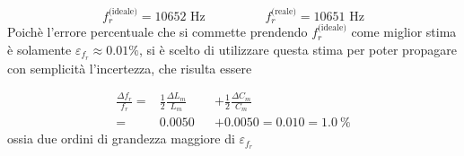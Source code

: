 \documentclass[12pt,italian]{article}
\begin{document}
\begin{equation*}
	f_{r}^{\text{(ideale)}} = 10652 \text{ Hz} \hspace{2cm} f_{r}^{\text{(reale)}} = 10651 \text{ Hz}
\end{equation*}
Poichè l'errore percentuale che si commette prendendo $f_{r}^{\text{(ideale)}}$
come miglior stima è solamente $\varepsilon_{f_r} \approx 0.01\%$, si è scelto
di utilizzare questa stima per poter propagare con semplicità l'incertezza, che
risulta essere

\begin{equation*}
	\begin{alignedat}{2}
		\frac{\Delta f_{r}}{f_{r}} = & \frac{1}{2} \frac{\Delta L_{m}}{L_{m}} &  & + \frac{1}{2} \frac{\Delta C_{m}}{C_{m}} \\
		=                            & 0.0050                                 &  & + 0.0050
		= 0.010 = 1.0 \ \%
	\end{alignedat}
\end{equation*}
ossia due ordini di grandezza maggiore di $\varepsilon_{f_r}$
\end{document}
